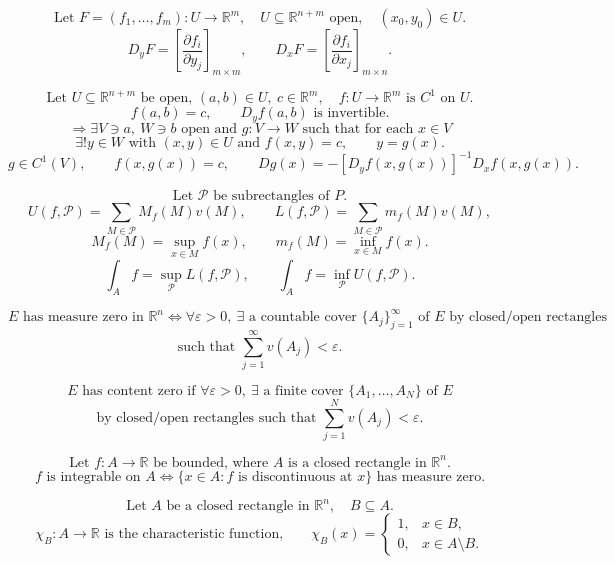 \documentclass[11pt]{article}
\newcommand{\R}{\mathbb R}
\begin{document}
\[
\text{Let }F=(f_1,\ldots,f_m):U\to\R^m,\quad
U\subseteq\R^{n+m}\text{ open},\quad (x_0,y_0)\in U.
\]
\[
D_yF=
\left[\frac{\partial f_i}{\partial y_j}\right]_{m\times m},
\qquad
D_xF=
\left[\frac{\partial f_i}{\partial x_j}\right]_{m\times n}.
\]

\[
\text{Let }U\subseteq\R^{n+m}\text{ be open, }(a,b)\in U,\ c\in\R^m,
\quad f:U\to\R^m\text{ is }C^1\text{ on }U.
\]
\[
f(a,b)=c,\qquad D_yf(a,b)\text{ is invertible.}
\]
\[
\Longrightarrow
\exists V\ni a,\ W\ni b\text{ open and }g:V\to W\text{ such that for each }x\in V
\]
\[
\exists!y\in W\text{ with }(x,y)\in U\text{ and }f(x,y)=c,\qquad y=g(x).
\]
\[
g\in C^1(V),\qquad f(x,g(x))=c,\qquad
Dg(x)=-[D_yf(x,g(x))]^{-1}D_xf(x,g(x)).
\]

\newpage


\[
\text{Let }\mathcal P\text{ be subrectangles of }P.
\]
\[
U(f,\mathcal P)=\sum_{M\in\mathcal P} M_f(M)v(M),
\qquad
L(f,\mathcal P)=\sum_{M\in\mathcal P} m_f(M)v(M),
\]
\[
M_f(M)=\sup_{x\in M}f(x),\qquad m_f(M)=\inf_{x\in M}f(x).
\]
\[
\int_A f=\sup_{\mathcal P}L(f,\mathcal P),\qquad
\int_A f=\inf_{\mathcal P}U(f,\mathcal P).
\]

\[
E\text{ has measure zero in }\R^n
\Longleftrightarrow
\forall\varepsilon>0,\ \exists\text{ a countable cover }\{A_j\}_{j=1}^{\infty}
\text{ of }E\text{ by closed/open rectangles}
\]
\[
\text{such that }\sum_{j=1}^{\infty}v(A_j)<\varepsilon.
\]

\[
E\text{ has content zero if }
\forall\varepsilon>0,\ \exists\text{ a finite cover }\{A_1,\ldots,A_N\}
\text{ of }E
\]
\[
\text{by closed/open rectangles such that }\sum_{j=1}^{N}v(A_j)<\varepsilon.
\]

\[
\text{Let }f:A\to\R\text{ be bounded, where }A\text{ is a closed rectangle in }\R^n.
\]
\[
f\text{ is integrable on }A
\Longleftrightarrow
\{x\in A:f\text{ is discontinuous at }x\}\text{ has measure zero.}
\]


\[
\text{Let }A\text{ be a closed rectangle in }\R^n,\quad B\subseteq A.
\]
\[
\chi_B:A\to\R\text{ is the characteristic function,}\qquad
\chi_B(x)=
\begin{cases}
1,&x\in B,\\
0,&x\in A\setminus B.
\end{cases}
\]
\end{document}
